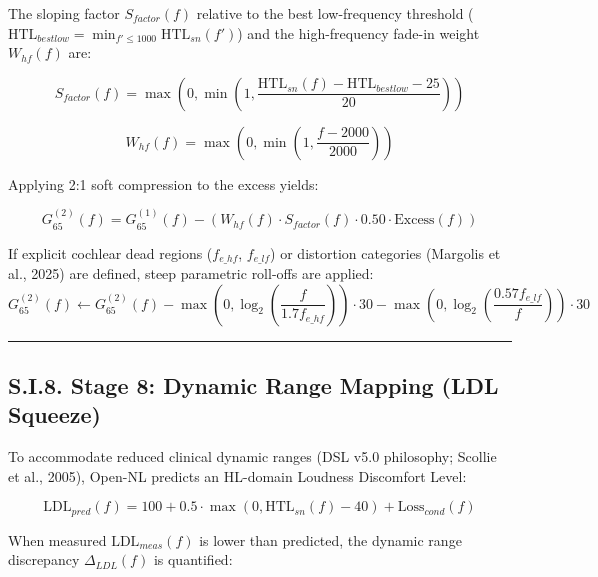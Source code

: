 \documentclass[
  12pt,
]{article}
\begin{document}
The sloping factor \(S_{factor}(f)\) relative to the best low-frequency
threshold
(\(\text{HTL}_{bestlow} = \min_{f' \le 1000} \text{HTL}_{sn}(f')\)) and
the high-frequency fade-in weight \(W_{hf}(f)\) are:

\begin{equation}
S_{factor}(f) = \max\left(0, \min\left(1, \frac{\text{HTL}_{sn}(f) - \text{HTL}_{bestlow} - 25}{20}\right)\right)
\end{equation}

\begin{equation}
W_{hf}(f) = \max\left(0, \min\left(1, \frac{f - 2000}{2000}\right)\right)
\end{equation}

Applying 2:1 soft compression to the excess yields:

\begin{equation}
G_{65}^{(2)}(f) = G_{65}^{(1)}(f) - \left(W_{hf}(f) \cdot S_{factor}(f) \cdot 0.50 \cdot \text{Excess}(f)\right)
\end{equation}

If explicit cochlear dead regions (\(f_{e\_hf}\), \(f_{e\_lf}\)) or
distortion categories (Margolis et al., 2025) are defined, steep
parametric roll-offs are applied: \begin{equation}
G_{65}^{(2)}(f) \leftarrow G_{65}^{(2)}(f) - \max\left(0, \log_2\left(\frac{f}{1.7 f_{e\_hf}}\right)\right) \cdot 30 - \max\left(0, \log_2\left(\frac{0.57 f_{e\_lf}}{f}\right)\right) \cdot 30
\end{equation}

\begin{center}\rule{0.5\linewidth}{0.5pt}\end{center}

\subsection{S.I.8. Stage 8: Dynamic Range Mapping (LDL
Squeeze)}\label{s.i.8.-stage-8-dynamic-range-mapping-ldl-squeeze}

To accommodate reduced clinical dynamic ranges (DSL v5.0 philosophy;
Scollie et al., 2005), Open-NL predicts an HL-domain Loudness Discomfort
Level:

\begin{equation}
\text{LDL}_{pred}(f) = 100 + 0.5 \cdot \max\left(0, \text{HTL}_{sn}(f) - 40\right) + \text{Loss}_{cond}(f)
\end{equation}

When measured \(\text{LDL}_{meas}(f)\) is lower than predicted, the
dynamic range discrepancy \(\Delta_{LDL}(f)\) is quantified:
\end{document}
